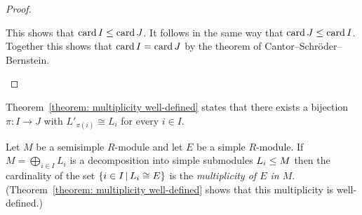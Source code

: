 \begin{proof}
\begin{itemize}
      This shows that $\operatorname{card}{I} \leq \operatorname{card}{J}$.
      It follows in the same way that $\operatorname{card}{J} \leq \operatorname{card}{I}$.
      Together this shows that $\operatorname{card}{I} = \operatorname{card}{J}$ by the theorem of Cantor--Schröder--Bernstein.
    \qedhere
  \end{itemize}
\end{proof}


\begin{remark}
  \label{remark: uniqueness of multiplicities alternative formulation}
  Theorem~\ref{theorem: multiplicity well-defined} states that there exists a bijection $\pi \colon I \to J$ with $L'_{\pi(i)} \cong L_i$ for every $i \in I$.
\end{remark}


\begin{definition}
  Let $M$ be a semisimple $R$-module and let $E$ be a simple $R$-module.
  If $M = \bigoplus_{i \in I} L_i$ is a decomposition into simple submodules $L_i \leq M$ then the cardinality of the set $\{i \in I \suchthat L_i \cong E\}$ is the \emph{multiplicity of $E$ in $M$}.
  (Theorem~\ref{theorem: multiplicity well-defined} shows that this multiplicity is well-defined.)
\end{definition}




